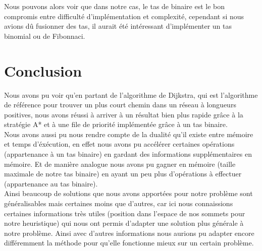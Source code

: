 \documentclass{article}
\begin{document}
Nous pouvons alors voir que dans notre cas, le tas de binaire est le bon compromis entre difficulté
d'implémentation et complexité, cependant si nous avions dû fusionner des tas, il aurait été intéressant
d'implémenter un tas binomial ou de Fibonnaci.



\pagebreak
\section{Conclusion}

Nous avons pu voir qu'en partant de l'algorithme de Dijkstra, qui est l'algorithme de référence pour trouver
un plus court chemin dans un réseau à longueurs positives, nous avons réussi à arriver à un résultat bien
plus rapide grâce à la stratégie A* et à une file de priorité implémentée grâce à un tas binaire.\\
Nous avons aussi pu nous rendre compte de la dualité qu'il existe entre mémoire et temps d'éxécution,
en effet nous avons pu accélérer certaines opérations (appartenance à un tas binaire) en gardant des
informations supplémentaires en mémoire. Et de manière analogue nous avons pu gagner en mémoire (taille
maximale de notre tas binaire) en ayant un peu plus d'opérations à effectuer (appartenance au tas binaire).\\

Ainsi beaucoup de solutions que nous avons apportées pour notre problème sont généralisables mais certaines
moins que d'autres, car ici nous connaissions certaines informations très utiles (position dans l'espace
de nos sommets pour notre heuristique) qui nous ont permis d'adapter une solution plus générale à notre
problème. Ainsi avec d'autres informations nous aurions pu adapter encore différemment la méthode pour
qu'elle fonctionne mieux sur un certain problème.
\end{document}
